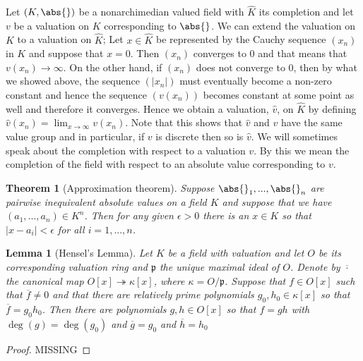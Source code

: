 \documentclass{article}
\newtheorem{theorem}{Theorem}[section]
\newtheorem{lemma}{Lemma}[section]
\newcommand{\mfrak}[1]{\mathfrak{#1}}
\begin{document}
Let $(K, \abs{})$ be a nonarchimedian valued field with $\hat K$ its completion and let $v$ be a valuation on $K$ corresponding to $\abs{}$. We can extend the valuation on $K$ to a valuation on $\hat K$; Let $x \in \hat K$ be represented by the Cauchy sequence $(x_n)$ in $K$ and suppose that $x = 0$. Then $(x_n)$ converges to 0 and that means that $v(x_n) \to \infty$. On the other hand, if $(x_n)$ does not converge to 0, then by what we showed above, the sequence $(|x_n|)$ must eventually become a non-zero constant and hence the sequence $(v(x_n))$ becomes constant at some point as well and therefore it converges. Hence we obtain a valuation, $\hat v$, on $\hat K$ by defining $\hat v(x_n) = \lim_{x \to \infty} v(x_n)$. Note that this shows that $\hat v$ and $v$ have the same value group and in particular, if $v$ is discrete then so is $\hat v$. We will sometimes speak about the completion with respect to a valuation $v$. By this we mean the completion of the field with respect to an absolute value corresponding to $v$. 

\begin{theorem}[Approximation theorem]\label{thm: Approximation theorem}
    Suppose $\abs{}_1, ..., \abs{}_n$ are pairwise inequivalent absolute values on a field $K$ and suppose that we have $(a_1, ..., a_n) \in K^n$. Then for any given $\epsilon > 0$ there is an $x \in K$ so that $|x - a_i| < \epsilon$ for all $i = 1, ..., n$. 
\end{theorem}


\begin{lemma}[Hensel's Lemma]
    Let $K$ be a field with valuation and let $O$ be its corresponding valuation ring and $\mfrak p$ the unique maximal ideal of $O$. Denote by $\overline{\cdot}$ the canonical map $O[x] \twoheadrightarrow \kappa[x]$, where $\kappa = O / \mfrak p$. Suppose that $f \in O[x]$ such that $\overline {f} \neq 0$ and that there are relatively prime polynomials $g_0,h_0 \in \kappa[x]$ so that $\overline f = g_0 h_0$. Then there are polynomials $g,h \in O[x]$ so that $f = gh$ with $\deg(g) = \deg(g_0)$ and $\overline g = g_0$ and $\overline h = h_0$ 
\end{lemma}
\begin{proof}
    MISSING
\end{proof}
\end{document}
